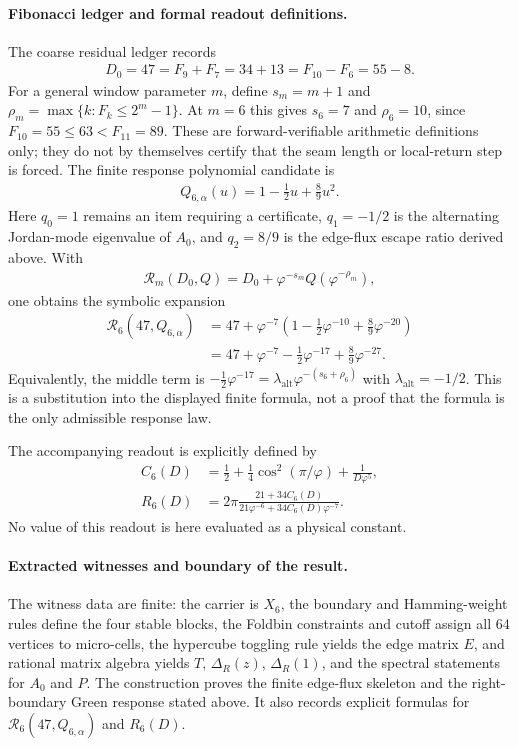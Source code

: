 \paragraph{Fibonacci ledger and formal readout definitions.}
The coarse residual ledger records
$$
\begin{aligned}
D_0=47=F_9+F_7=34+13=F_{10}-F_6=55-8.
\end{aligned}
$$
For a general window parameter $m$, define $s_m=m+1$ and $\rho_m=\max\{k:F_k\leq 2^m-1\}$. At $m=6$ this gives $s_6=7$ and $\rho_6=10$, since $F_{10}=55\leq 63<F_{11}=89$. These are forward-verifiable arithmetic definitions only; they do not by themselves certify that the seam length or local-return step is forced. The finite response polynomial candidate is
$$
\begin{aligned}
Q_{6,\alpha}(u)=1-\frac{1}{2}u+\frac{8}{9}u^2.
\end{aligned}
$$
Here $q_0=1$ remains an item requiring a certificate, $q_1=-1/2$ is the alternating Jordan-mode eigenvalue of $A_0$, and $q_2=8/9$ is the edge-flux escape ratio derived above. With
$$
\begin{aligned}
\mathcal{R}_m(D_0,Q)=D_0+\varphi^{-s_m}Q(\varphi^{-\rho_m}),
\end{aligned}
$$
one obtains the symbolic expansion
$$
\begin{aligned}
\mathcal{R}_6(47,Q_{6,\alpha})
&=47+\varphi^{-7}\left(1-\frac{1}{2}\varphi^{-10}+\frac{8}{9}\varphi^{-20}\right)\\
&=47+\varphi^{-7}-\frac{1}{2}\varphi^{-17}+\frac{8}{9}\varphi^{-27}.
\end{aligned}
$$
Equivalently, the middle term is $-\frac{1}{2}\varphi^{-17}=\lambda_{\mathrm{alt}}\varphi^{-(s_6+\rho_6)}$ with $\lambda_{\mathrm{alt}}=-1/2$. This is a substitution into the displayed finite formula, not a proof that the formula is the only admissible response law.

The accompanying readout is explicitly defined by
$$
\begin{aligned}
C_6(D)&=\frac{1}{2}+\frac{1}{4}\cos^2(\pi/\varphi)+\frac{1}{D\varphi^5},\\
R_6(D)&=2\pi\frac{21+34C_6(D)}{21\varphi^{-6}+34C_6(D)\varphi^{-7}}.
\end{aligned}
$$
No value of this readout is here evaluated as a physical constant.

\paragraph{Extracted witnesses and boundary of the result.}
The witness data are finite: the carrier is $X_6$, the boundary and Hamming-weight rules define the four stable blocks, the Foldbin constraints and cutoff assign all $64$ vertices to micro-cells, the hypercube toggling rule yields the edge matrix $E$, and rational matrix algebra yields $T$, $\Delta_R(z)$, $\Delta_R(1)$, and the spectral statements for $A_0$ and $P$. The construction proves the finite edge-flux skeleton and the right-boundary Green response stated above. It also records explicit formulas for $\mathcal{R}_6(47,Q_{6,\alpha})$ and $R_6(D)$.

